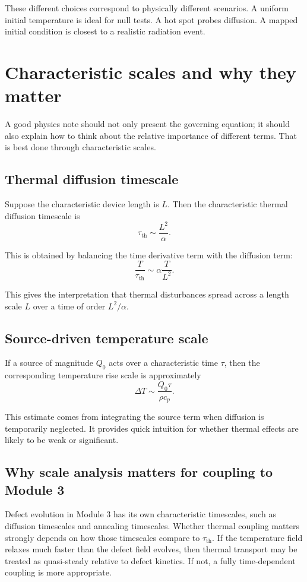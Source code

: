 \documentclass[11pt]{article}
\begin{document}
These different choices correspond to physically different scenarios. A uniform initial temperature is ideal for null tests. A hot spot probes diffusion. A mapped initial condition is closest to a realistic radiation event.

\section{Characteristic scales and why they matter}

A good physics note should not only present the governing equation; it should also explain how to think about the relative importance of different terms. That is best done through characteristic scales.

\subsection{Thermal diffusion timescale}

Suppose the characteristic device length is $L$. Then the characteristic thermal diffusion timescale is
\[
\tau_{\mathrm{th}} \sim \frac{L^2}{\alpha}.
\]

This is obtained by balancing the time derivative term with the diffusion term:
\[
\frac{T}{\tau_{\mathrm{th}}} \sim \alpha \frac{T}{L^2}.
\]

This gives the interpretation that thermal disturbances spread across a length scale $L$ over a time of order $L^2/\alpha$.

\subsection{Source-driven temperature scale}

If a source of magnitude $Q_0$ acts over a characteristic time $\tau$, then the corresponding temperature rise scale is approximately
\[
\Delta T \sim \frac{Q_0\tau}{\rho c_p}.
\]

This estimate comes from integrating the source term when diffusion is temporarily neglected. It provides quick intuition for whether thermal effects are likely to be weak or significant.

\subsection{Why scale analysis matters for coupling to Module 3}

Defect evolution in Module 3 has its own characteristic timescales, such as diffusion timescales and annealing timescales. Whether thermal coupling matters strongly depends on how those timescales compare to $\tau_{\mathrm{th}}$. If the temperature field relaxes much faster than the defect field evolves, then thermal transport may be treated as quasi-steady relative to defect kinetics. If not, a fully time-dependent coupling is more appropriate.
\end{document}
